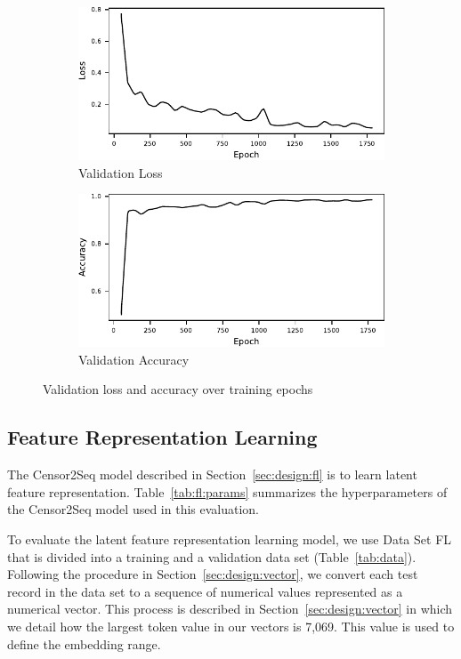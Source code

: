 \begin{figure}[!htbp]
	\centering
	\begin{subfigure}[b]{0.8\columnwidth}
		\centering
		\includegraphics[width=\textwidth]{figures/densenet_validation_loss.pdf}
		\caption{Validation Loss}
		\label{fig:dn_val_loss}
	\end{subfigure}
	\hfill
	\begin{subfigure}[b]{0.8\columnwidth}
		\centering
		\includegraphics[width=\textwidth]{figures/densenet_validation_accuracy.pdf}
		\caption{Validation Accuracy}
		\label{fig:dn_val_acc}
	\end{subfigure}
	\caption{Validation loss and accuracy over training epochs}
	\label{fig:dn:train}
\end{figure}

\subsection{Feature Representation Learning}
The Censor2Seq model described in Section~\ref{sec:design:fl} is to learn
latent feature representation.  Table~\ref{tab:fl:params} summarizes the
hyperparameters of the Censor2Seq model used in this evaluation.  


To evaluate the latent feature representation learning model, we use Data Set
FL that is divided into a training and a validation data set (Table~\ref{tab:data}).  
Following the procedure in Section~\ref{sec:design:vector}, we convert
each test record in the data set to a sequence of numerical values
represented as a numerical vector. This process is described in Section~\ref{sec:design:vector}
in which we detail how the largest token value in our vectors is 7,069. This value is used to define
the embedding range.

